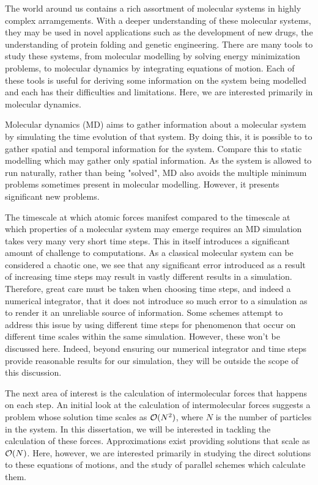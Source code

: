 %
%


The world around us contains
a rich assortment of molecular systems
in highly complex arramgements.
%
With a deeper understanding of these molecular systems,
they may be used in novel applications
such as the development of new drugs,
the understanding of protein folding and
genetic engineering.
%
There are many tools to study these systems,
from molecular modelling by solving energy minimization problems,
to molecular dynamics by integrating equations of motion.
%
Each of these tools is useful for deriving some information on
the system being modelled and each has their difficulties and limitations.
%
Here, we are interested primarily in molecular dynamics.

Molecular dynamics (MD) aims to gather information
about a molecular system by simulating the time evolution of
that system.
%
By doing this, it is possible to to gather
spatial and temporal information for the system.
%
Compare this to static modelling which may gather only spatial information.
%
As the system is allowed to run naturally, rather than being "solved",
MD also avoids the multiple minimum problems
sometimes present in molecular modelling.
%
However, it presents significant new problems.

The timescale at which atomic forces manifest compared to the timescale at
which properties of a molecular system may emerge requires an MD simulation
takes very many very short time steps.
%
This in itself introduces a significant amount of challenge to computations.
%
As a classical molecular system can be considered a chaotic one, we see
that any significant error introduced as a result of increasing time steps
may result in vastly different results in a simulation.
%
Therefore, great care must be taken when choosing time steps, and indeed
a numerical integrator, that it does not introduce so much error to a
simulation as to render it an unreliable source of information.
%
Some schemes attempt to address this issue by using different time steps
for phenomenon that occur on different time scales within the same simulation.
%
However, these won't be discussed here.
%
Indeed, beyond ensuring our numerical integrator and time steps provide
reasonable results for our simulation, they will be outside the scope
of this discussion.

The next area of interest is
the calculation of intermolecular forces that happens on each step.
%
An initial look at the calculation of intermolecular forces suggests
a problem whose solution time scales as $\mathcal{O}{(N^2)}$, where $N$ is the
number of particles in the system.
%
In this dissertation, we will be interested in tackling the calculation
of these forces.
%
Approximations exist providing solutions that scale as $\mathcal{O}{(N)}$.
%
Here, however, we are interested primarily in studying the direct
solutions to these equations of motions, and the study of parallel schemes
which calculate them.

